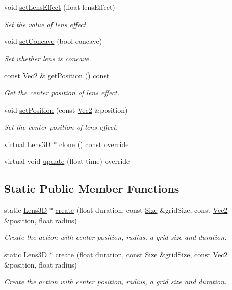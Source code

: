 \begin{DoxyCompactItemize}
void \hyperlink{classLens3D_abd9544a7f5363453a0b882b7e92eefdd}{set\+Lens\+Effect} (float lens\+Effect)
\begin{DoxyCompactList}\small\item\em Set the value of lens effect. \end{DoxyCompactList}\item 
void \hyperlink{classLens3D_a76df2e34885baea1eb3e83506f71ac98}{set\+Concave} (bool concave)
\begin{DoxyCompactList}\small\item\em Set whether lens is concave. \end{DoxyCompactList}\item 
const \hyperlink{classVec2}{Vec2} \& \hyperlink{classLens3D_ad4981a40ade698e4a98bc2f1196810aa}{get\+Position} () const
\begin{DoxyCompactList}\small\item\em Get the center position of lens effect. \end{DoxyCompactList}\item 
void \hyperlink{classLens3D_a1d9650798d3531090fef66a64da15be8}{set\+Position} (const \hyperlink{classVec2}{Vec2} \&position)
\begin{DoxyCompactList}\small\item\em Set the center position of lens effect. \end{DoxyCompactList}\item 
virtual \hyperlink{classLens3D}{Lens3D} $\ast$ \hyperlink{classLens3D_ad628edf64ecd2f4fe17a6ae7530cf2b7}{clone} () const override
\item 
virtual void \hyperlink{classLens3D_a955fbb9a4a32528edf40388a891f73db}{update} (float time) override
\end{DoxyCompactItemize}
\subsection*{Static Public Member Functions}
\begin{DoxyCompactItemize}
\item 
static \hyperlink{classLens3D}{Lens3D} $\ast$ \hyperlink{classLens3D_a6c604a8898ada07ab564bcd596f32b7d}{create} (float duration, const \hyperlink{classSize}{Size} \&grid\+Size, const \hyperlink{classVec2}{Vec2} \&position, float radius)
\begin{DoxyCompactList}\small\item\em Create the action with center position, radius, a grid size and duration. \end{DoxyCompactList}\item 
static \hyperlink{classLens3D}{Lens3D} $\ast$ \hyperlink{classLens3D_abb5f80c3bde54ad65f88d9646a894bd4}{create} (float duration, const \hyperlink{classSize}{Size} \&grid\+Size, const \hyperlink{classVec2}{Vec2} \&position, float radius)
\begin{DoxyCompactList}\small\item\em Create the action with center position, radius, a grid size and duration. \end{DoxyCompactList}\end{DoxyCompactItemize}
